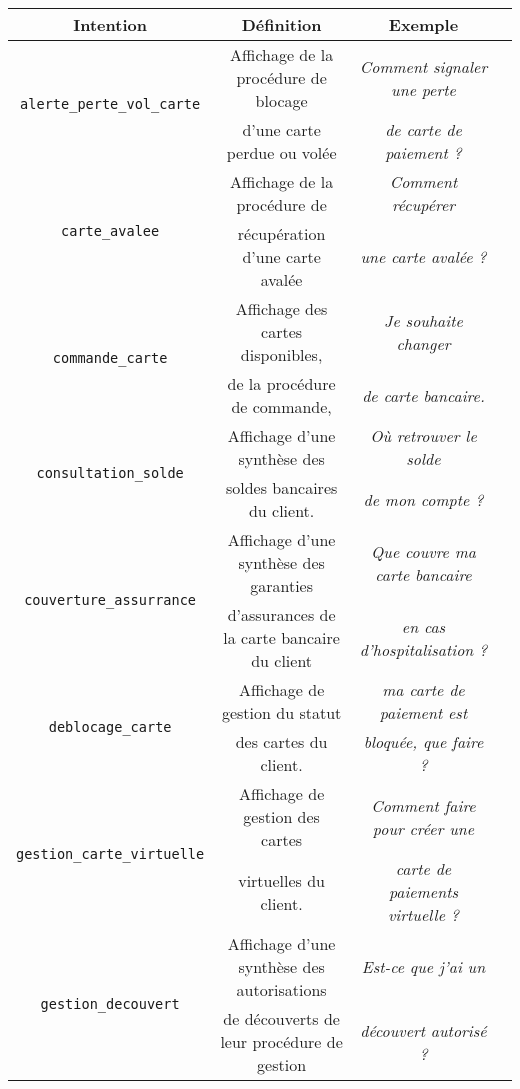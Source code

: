 	\begin{table}[!htb]
		\begin{center}
		\begin{scriptsize}
		\begin{tabular}{|c|c|c|c|}
		
			\hline
			\textbf{Intention}
				& \textbf{Définition}
				& \textbf{Exemple}
				\tabularnewline
				\hline
			\multirow{2}{*}{\texttt{alerte\_perte\_vol\_carte}}
				& Affichage de la procédure de blocage
				& \textit{Comment signaler une perte}
				\tabularnewline
				& d'une carte perdue ou volée
				& \textit{de carte de paiement ?}
				\tabularnewline
				\hline
			\multirow{2}{*}{\texttt{carte\_avalee}}
				& Affichage de la procédure de
				& \textit{Comment récupérer}
				\tabularnewline
				& récupération d'une carte avalée
				& \textit{une carte avalée ?}
				\tabularnewline
				\hline
			\multirow{2}{*}{\texttt{commande\_carte}}
				& Affichage des cartes disponibles,
				& \textit{Je souhaite changer}
				\tabularnewline
				& de la procédure de commande,
				& \textit{de carte bancaire.}
				\tabularnewline
				\hline
			\multirow{2}{*}{\texttt{consultation\_solde}}
				& Affichage d'une synthèse des
				& \textit{Où retrouver le solde}
				\tabularnewline
				& soldes bancaires du client.
				& \textit{ de mon compte ?}
				\tabularnewline
				\hline
			\multirow{2}{*}{\texttt{couverture\_assurrance}}
				& Affichage d'une synthèse des garanties
				& \textit{Que couvre ma carte bancaire}
				\tabularnewline
				& d'assurances de la carte bancaire du client
				& \textit{en cas d'hospitalisation ?}
				\tabularnewline
				\hline
			\multirow{2}{*}{\texttt{deblocage\_carte}}
				& Affichage de gestion du statut
				& \textit{ma carte de paiement est}
				\tabularnewline
				& des cartes du client.
				& \textit{bloquée, que faire ?}
				\tabularnewline
				\hline
			\multirow{2}{*}{\texttt{gestion\_carte\_virtuelle}}
				& Affichage de gestion des cartes
				& \textit{Comment faire pour créer une}
				\tabularnewline
				& virtuelles du client.
				& \textit{carte de paiements virtuelle ?}
				\tabularnewline
				\hline
			\multirow{2}{*}{\texttt{gestion\_decouvert}}
				& Affichage d'une synthèse des autorisations
				& \textit{Est-ce que j'ai un}
				\tabularnewline
				& de découverts de leur procédure de gestion
				& \textit{découvert autorisé ?}

\end{tabular}
\end{scriptsize}
\end{center}
\end{table}
